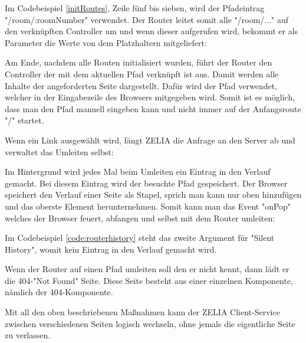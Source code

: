 Im Codebeispiel \ref{initRoutes}, Zeile fünf bis sieben, wird der Pfadeintrag "{\ttfamily /room/:roomNumber}" verwendet. Der Router leitet somit alle "{\ttfamily /room/...}" auf den verknüpften Controller um und wenn dieser aufgerufen wird, bekommt er als Parameter die Werte von dem Platzhaltern mitgeliefert:


Am Ende, nachdem alle Routen initialisiert wurden, führt der Router den Controller der mit dem aktuellen Pfad verknüpft ist aus. Damit werden alle  Inhalte der angeforderten Seite dargestellt. Dafür wird der Pfad verwendet, welcher in der Eingabezeile des Browsers mitgegeben wird. Somit ist es möglich, dass man den Pfad manuell eingeben kann und nicht immer auf der Anfangsroute "{\ttfamily /}" startet.

Wenn ein Link ausgewählt wird, fängt ZELIA die Anfrage an den Server ab und verwaltet das Umleiten selbst:


Im  Hintergrund wird jedes Mal beim Umleiten ein Eintrag in den Verlauf gemacht. Bei diesem Eintrag wird der besuchte Pfad gespeichert. Der Browser speichert den Verlauf einer Seite als Stapel, sprich man kann nur oben hinzufügen und das oberste Element herunternehmen. Somit kann man das Event "onPop" welches der Browser feuert, abfangen und selbst mit dem Router umleiten:


Im Codebeispiel \ref{code:routerhistory} steht das zweite Argument für "Silent History", womit kein Eintrag in den Verlauf gemacht wird.

Wenn der Router auf einen Pfad umleiten soll den er nicht kennt, dann lädt er die 404-"Not Found" Seite. Diese Seite besteht aus einer einzelnen Komponente, nämlich der 404-Komponente.


Mit all den oben beschriebenen Maßnahmen kann der ZELIA Client-Service zwischen verschiedenen Seiten logisch wechseln, ohne jemals die eigentliche Seite zu verlassen.
